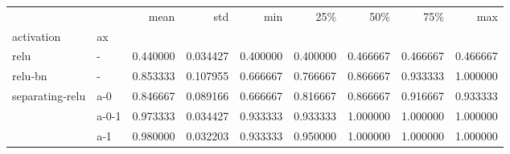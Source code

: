 \begin{tabular}{llrrrrrrr}
\toprule
                &     &      mean &       std &       min &       25\% &       50\% &       75\% &       max \\
activation & ax &           &           &           &           &           &           &           \\
\midrule
relu & - &  0.440000 &  0.034427 &  0.400000 &  0.400000 &  0.466667 &  0.466667 &  0.466667 \\
relu-bn & - &  0.853333 &  0.107955 &  0.666667 &  0.766667 &  0.866667 &  0.933333 &  1.000000 \\
separating-relu & a-0 &  0.846667 &  0.089166 &  0.666667 &  0.816667 &  0.866667 &  0.916667 &  0.933333 \\
                & a-0-1 &  0.973333 &  0.034427 &  0.933333 &  0.933333 &  1.000000 &  1.000000 &  1.000000 \\
                & a-1 &  0.980000 &  0.032203 &  0.933333 &  0.950000 &  1.000000 &  1.000000 &  1.000000 \\
\bottomrule
\end{tabular}
